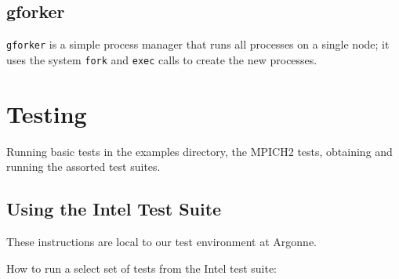 \documentclass[dvipdfm,11pt]{article}
\begin{document}
\subsection{gforker}
\label{sec:forker}
\texttt{gforker} is a simple process manager that runs all processes
on a single node; it uses the system \texttt{fork} and \texttt{exec}
calls to create the new processes.  

\section{Testing}
\label{sec:testing}
Running basic tests in the examples directory, the MPICH2 tests,
obtaining and running the assorted test suites.  


\subsection{Using the Intel Test Suite}
\label{sec:intel}

These instructions are local to our test environment at Argonne.

How to run a select set of tests from the Intel test suite:
\end{document}
